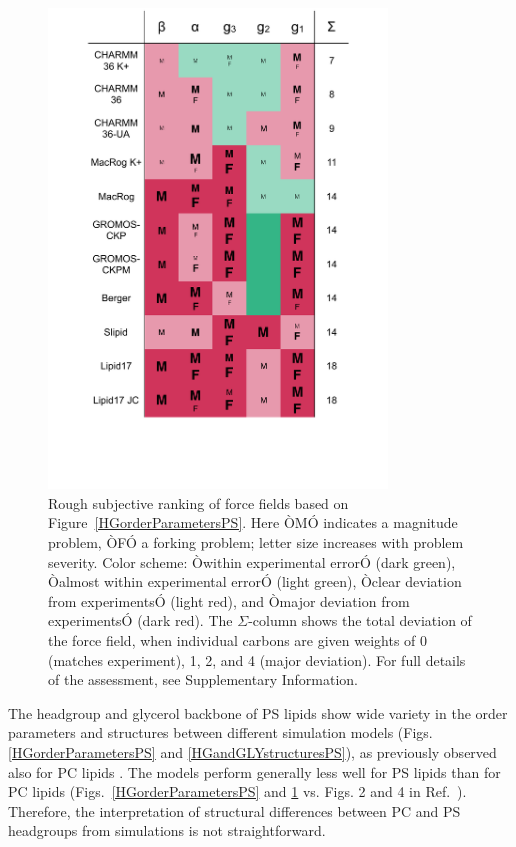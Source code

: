 \documentclass[aps,prl,superscriptaddress,twocolumn]{revtex4}
\begin{document}
\begin{figure}[]
  \centering
  \includegraphics[width=9.0cm]{../Figs/comparisonTablePS.pdf}
  \caption{\label{comparisonTablePS}
    Rough subjective ranking of force fields based on Figure~\ref{HGorderParametersPS}.
    Here ÒMÓ indicates a magnitude problem, ÒFÓ a forking problem; letter size increases with problem severity. Color scheme: Òwithin experimental errorÓ (dark green), Òalmost within experimental errorÓ (light green), Òclear deviation from experimentsÓ (light red), and Òmajor deviation from experimentsÓ (dark red). The $\Sigma$-column shows the total deviation of the force field, when individual carbons are given weights of 0 (matches experiment), 1, 2, and 4 (major deviation). For full details of the assessment, see Supplementary Information.
  }
\end{figure}

The headgroup and glycerol backbone of PS lipids show wide variety in the order parameters and structures
between different simulation models (Figs. \ref{HGorderParametersPS} and \ref{HGandGLYstructuresPS}),
as previously observed also for PC lipids \cite{botan15}.
The models perform generally less well for PS lipids than for PC lipids 
(Figs.~\ref{HGorderParametersPS} and \ref{comparisonTablePS} vs. Figs. 2 and 4 in Ref.~\cite{botan15}).
Therefore, the interpretation of structural differences between PC and PS headgroups
from simulations is not straightforward.
\end{document}
